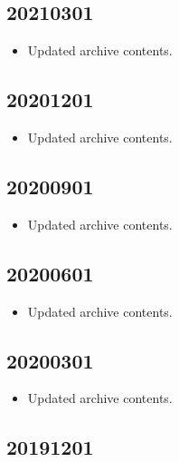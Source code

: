 \documentclass[hidelinks,a4paper,12pt]{article}
\begin{document}
\subsection{20210301}  \label{sec:changelog_20210301}

\begin{itemize}
\item Updated archive contents.
\end{itemize}

\subsection{20201201}  \label{sec:changelog_20201201}

\begin{itemize}
\item Updated archive contents.
\end{itemize}

\subsection{20200901}  \label{sec:changelog_20200901}

\begin{itemize}
\item Updated archive contents.
\end{itemize}

\subsection{20200601}  \label{sec:changelog_20200601}

\begin{itemize}
\item Updated archive contents.
\end{itemize}

\subsection{20200301}  \label{sec:changelog_20200301}

\begin{itemize}
\item Updated archive contents.
\end{itemize}

\subsection{20191201}  \label{sec:changelog_20191201}
\end{document}

